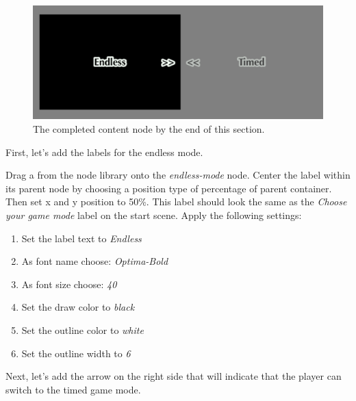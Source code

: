 \begin{figure}[H]
		\centering
		\includegraphics[width=0.6\linewidth]{images/Chapter7/content_node_completed.png}
		\caption{The completed content node by the end of this section.}
\end{figure}

First, let's add the labels for the endless mode.

\begin{leftbar}
Drag a \cclabel{} from the node library onto the \textit{endless-mode} node.
Center the label within its parent node by choosing a position type of
percentage of parent container. Then set x and y position to 50\%. This label
should look the same as the \textit{Choose your game mode} label on the start
scene. Apply the following settings:
\begin{enumerate}
  \item Set the label text to \textit{Endless}
  \item As font name choose: \textit{Optima-Bold}
  \item As font size choose: \textit{40}
  \item Set the draw color to \textit{black}
  \item Set the outline color to \textit{white}
  \item Set the outline width to \textit{6}
\end{enumerate}
\end{leftbar}

Next, let's add the arrow on the right side that will indicate that the player
can switch to the timed game mode.

